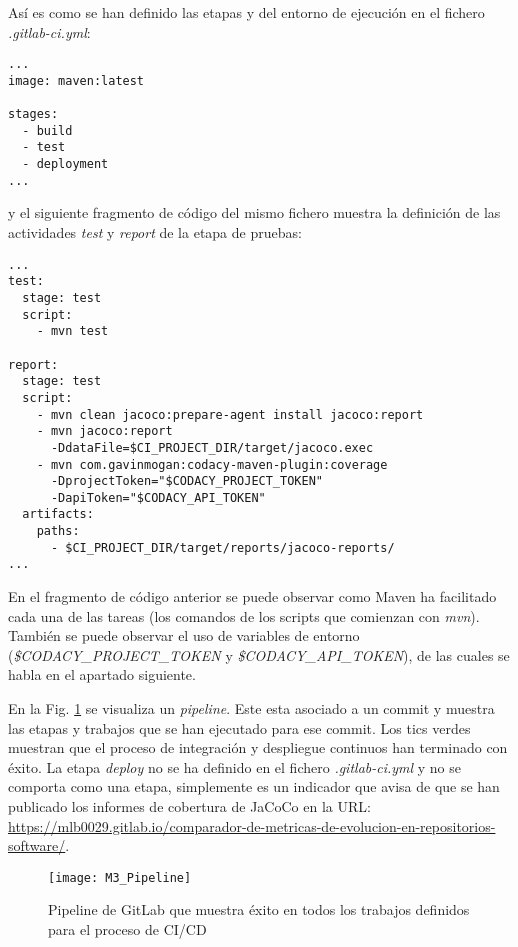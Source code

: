 Así es como se han definido las etapas y del entorno de ejecución en el fichero \textit{.gitlab-ci.yml}:\\
\begin{minipage}{\linewidth}
{\tiny
\begin{lstlisting}[breaklines]
...
image: maven:latest

stages:
  - build
  - test
  - deployment
...
\end{lstlisting}
}
\end{minipage}
y el siguiente fragmento de código del mismo fichero muestra la definición de las actividades \textit{test} y \textit{report} de la etapa de pruebas:\\
\begin{minipage}{\linewidth}
{\tiny
\begin{lstlisting}[breaklines]
...
test:
  stage: test
  script:
	- mvn test

report:
  stage: test
  script:
	- mvn clean jacoco:prepare-agent install jacoco:report
	- mvn jacoco:report 
	  -DdataFile=$CI_PROJECT_DIR/target/jacoco.exec
	- mvn com.gavinmogan:codacy-maven-plugin:coverage 
	  -DprojectToken="$CODACY_PROJECT_TOKEN" 
	  -DapiToken="$CODACY_API_TOKEN"
  artifacts:
	paths:
	  - $CI_PROJECT_DIR/target/reports/jacoco-reports/
...		
\end{lstlisting}
}
\end{minipage}

En el fragmento de código anterior se puede observar como Maven ha facilitado cada una de las tareas (los comandos de los scripts que comienzan con \textit{mvn}). También se puede observar el uso de variables de entorno (\textit{\$CODACY\_PROJECT\_TOKEN} y \textit{\$CODACY\_API\_TOKEN}), de las cuales se habla en el apartado siguiente.

 En la Fig. \ref{fig:M5_Pipeline} se visualiza un \textit{pipeline}. Este esta asociado a un commit y muestra las etapas y trabajos que se han ejecutado para ese commit. Los tics verdes muestran que el proceso de integración y despliegue continuos han terminado con éxito. La etapa \textit{deploy} no se ha definido en el fichero \textit{.gitlab-ci.yml} y no se comporta como una etapa, simplemente es un indicador que avisa de que se han publicado los informes de cobertura de JaCoCo en la URL: \url{https://mlb0029.gitlab.io/comparador-de-metricas-de-evolucion-en-repositorios-software/}.
 
 \begin{figure}[!h]
 	\centering
 	\texttt{[image: M3\_Pipeline]}
 	\caption{Pipeline de GitLab que muestra éxito en todos los trabajos definidos para el proceso de CI/CD}\label{fig:M5_Pipeline}
 \end{figure}
 \FloatBarrier
 
